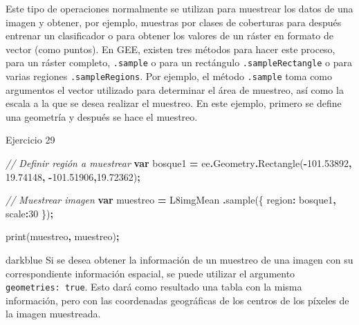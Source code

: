 \documentclass[
  12pt,
  letterpaper,
  twoside]{book}
\newenvironment{Shaded}{\begin{snugshade}}{\end{snugshade}}
\newcommand{\AttributeTok}[1]{\textcolor[rgb]{0.77,0.63,0.00}{#1}}
\newcommand{\CommentTok}[1]{\textcolor[rgb]{0.56,0.35,0.01}{\textit{#1}}}
\newcommand{\DataTypeTok}[1]{\textcolor[rgb]{0.13,0.29,0.53}{#1}}
\newcommand{\DecValTok}[1]{\textcolor[rgb]{0.00,0.00,0.81}{#1}}
\newcommand{\FloatTok}[1]{\textcolor[rgb]{0.00,0.00,0.81}{#1}}
\newcommand{\FunctionTok}[1]{\textcolor[rgb]{0.00,0.00,0.00}{#1}}
\newcommand{\KeywordTok}[1]{\textcolor[rgb]{0.13,0.29,0.53}{\textbf{#1}}}
\newcommand{\NormalTok}[1]{#1}
\newcommand{\OperatorTok}[1]{\textcolor[rgb]{0.81,0.36,0.00}{\textbf{#1}}}
\newcommand{\StringTok}[1]{\textcolor[rgb]{0.31,0.60,0.02}{#1}}
\begin{document}
Este tipo de operaciones normalmente se utilizan para muestrear los datos de una imagen y obtener, por ejemplo, muestras por clases de coberturas para después entrenar un clasificador o para obtener los valores de un ráster en formato de vector (como puntos). En GEE, existen tres métodos para hacer este proceso, para un ráster completo, \texttt{.sample} o para un rectángulo \texttt{.sampleRectangle} o para varias regiones \texttt{.sampleRegions}. Por ejemplo, el método \texttt{.sample} toma como argumentos el vector utilizado para determinar el área de muestreo, así como la escala a la que se desea realizar el muestreo. En este ejemplo, primero se define una geometría y después se hace el muestreo.

Ejercicio 29

\begin{Shaded}
\begin{Highlighting}[]
\CommentTok{// Definir región a muestrear}
\KeywordTok{var}\NormalTok{ bosque1 }\OperatorTok{=}\NormalTok{ ee}\OperatorTok{.}\AttributeTok{Geometry}\OperatorTok{.}\FunctionTok{Rectangle}\NormalTok{(}\OperatorTok{{-}}\FloatTok{101.53892}\OperatorTok{,} \FloatTok{19.74148}\OperatorTok{,} 
  \OperatorTok{{-}}\FloatTok{101.51906}\OperatorTok{,}\FloatTok{19.72362}\NormalTok{)}\OperatorTok{;}
\end{Highlighting}
\end{Shaded}

\begin{Shaded}
\begin{Highlighting}[]
\CommentTok{// Muestrear imagen}
\KeywordTok{var}\NormalTok{ muestreo }\OperatorTok{=}\NormalTok{ L8imgMean}
  \OperatorTok{.}\FunctionTok{sample}\NormalTok{(\{}
    \DataTypeTok{region}\OperatorTok{:}\NormalTok{ bosque1}\OperatorTok{,}
    \DataTypeTok{scale}\OperatorTok{:}\DecValTok{30}
\NormalTok{  \})}\OperatorTok{;}

\FunctionTok{print}\NormalTok{(muestreo}\OperatorTok{,} \StringTok{\textquotesingle{}muestreo\textquotesingle{}}\NormalTok{)}\OperatorTok{;}
\end{Highlighting}
\end{Shaded}

\begin{bluebox2}

\begin{awesomeblock}{5pt}{\faLightbulb}{darkblue}
Si se desea obtener la información de un muestreo de una imagen con su correspondiente información espacial, se puede utilizar el argumento \texttt{geometries:\ true}. Esto dará como resultado una tabla con la misma información, pero con las coordenadas geográficas de los centros de los píxeles de la imagen muestreada.

\end{awesomeblock}

\end{bluebox2}
\end{document}
